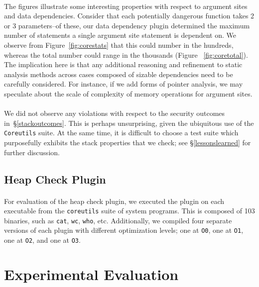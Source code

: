 \documentclass[letterpaper,11pt]{article}
\begin{document}
\paragraph{}
The figures illustrate some interesting properties with respect to argument
sites and data dependencies. Consider that each potentially dangerous function
takes 2 or 3 parameters--of these, our data dependency plugin determined the
maximum number of statements a single argument site statement is dependent on.
We observe from Figure~\ref{fig:corestats} that this could number in the hundreds,
whereas the total number could range in the thousands (Figure ~\ref{fig:coretotal}).
The implication here is that any additional reasoning and refinement to static
analysis methods across cases composed of sizable dependencies need to be
carefully considered. For instance, if we add forms of pointer analysis,
we may speculate about the scale of complexity of memory operations for
argument sites.

\paragraph{}
We did not observe any violations with respect to the security outcomes
in~\S\ref{stackoutcomes}. This is perhaps unsurprising, given the ubiquitous
use of the \texttt{Coreutils} suite. At the same time, it is difficult to
choose a test suite which purposefully exhibits the stack properties that we
check; see \S\ref{lessonslearned} for further discussion.

\subsection{Heap Check Plugin}
\paragraph{}
For evaluation of the heap check plugin, we executed the plugin on each
executable from the \texttt{coreutils} suite of system programs. This is composed of
103 binaries, such as \texttt{cat}, \texttt{wc}, \texttt{who}, etc. Additionally, we compiled four
separate versions of each plugin with different optimization levels; one at
\texttt{O0}, one at \texttt{O1}, one at \texttt{O2}, and one at \texttt{O3}.


\section{Experimental Evaluation}
\end{document}
